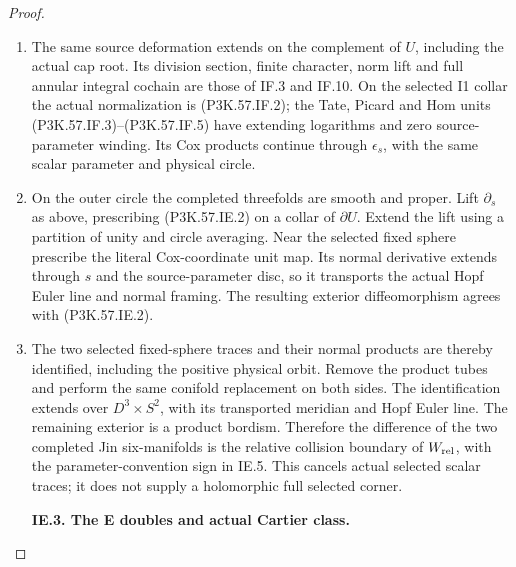 \begin{proof}
\begin{enumerate}[label=\arabic*.]
\item The same source deformation extends on the complement
of \(U\), including the actual cap root. Its division
section, finite character, norm lift and full annular
integral cochain are those of IF.3 and IF.10. On the
selected I1 collar the actual normalization is (P3K.57.IF.2);
the Tate, Picard and Hom units (P3K.57.IF.3)--\allowbreak (P3K.57.IF.5) have
extending logarithms and zero source-parameter winding.
Its Cox products continue through \(\epsilon_s\), with
the same scalar parameter and physical circle.

\item On the outer circle the completed threefolds are smooth
and proper. Lift \(\partial_s\) as above, prescribing
(P3K.57.IE.2) on a collar of \(\partial U\). Extend the lift
using a partition of unity and circle averaging.
Near the selected fixed sphere prescribe the literal
Cox-coordinate unit map. Its normal derivative extends
through \(s\) and the source-parameter disc, so it
transports the actual Hopf Euler line and normal
framing. The resulting exterior diffeomorphism agrees
with (P3K.57.IE.2).

\item The two selected fixed-sphere traces and their normal
products are thereby identified, including the positive
physical orbit. Remove the product tubes and perform
the same conifold replacement on both sides. The
identification extends over \(D^3\times S^2\), with
its transported meridian and Hopf Euler line. The
remaining exterior is a product bordism. Therefore
the difference of the two completed Jin six-manifolds
is the relative collision boundary of \(W_{\rm rel}\),
with the parameter-convention sign in IE.5.
This cancels actual selected scalar traces; it does
not supply a holomorphic full selected corner.

\par\medskip\noindent\textbf{IE.3. The E doubles and actual Cartier class.}\par\nopagebreak[4]


\end{enumerate}
\end{proof}
